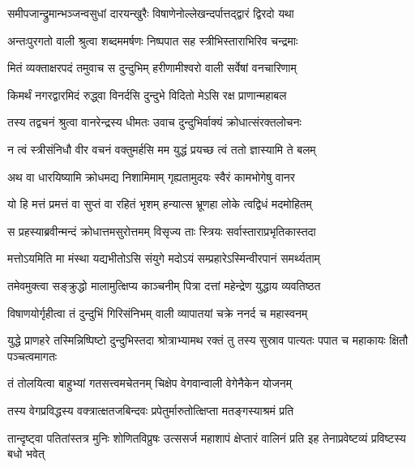 \twolineshloka
{समीपजान्द्रुमान्भञ्जन्वसुधां दारयन्खुरैः}
{विषाणेनोल्लेखन्दर्पात्तद्द्वारं द्विरदो यथा} %

\twolineshloka
{अन्तःपुरगतो वाली श्रुत्वा शब्दममर्षणः}
{निष्पपात सह स्त्रीभिस्ताराभिरिव चन्द्रमाः} %

\twolineshloka
{मितं व्यक्ताक्षरपदं तमुवाच स दुन्दुभिम्}
{हरीणामीश्वरो वाली सर्वेषां वनचारिणाम्} %

\twolineshloka
{किमर्थं नगरद्वारमिदं रुद्ध्वा विनर्दसि}
{दुन्दुभे विदितो मेऽसि रक्ष प्राणान्महाबल} %

\twolineshloka
{तस्य तद्वचनं श्रुत्वा वानरेन्द्रस्य धीमतः}
{उवाच दुन्दुभिर्वाक्यं क्रोधात्संरक्तलोचनः} %

\twolineshloka
{न त्वं स्त्रीसंनिधौ वीर वचनं वक्तुमर्हसि}
{मम युद्धं प्रयच्छ त्वं ततो ज्ञास्यामि ते बलम्} %

\twolineshloka
{अथ वा धारयिष्यामि क्रोधमद्य निशामिमाम्}
{गृह्यतामुदयः स्वैरं कामभोगेषु वानर} %

\twolineshloka
{यो हि मत्तं प्रमत्तं वा सुप्तं वा रहितं भृशम्}
{हन्यात्स भ्रूणहा लोके त्वद्विधं मदमोहितम्} %

\twolineshloka
{स प्रहस्याब्रवीन्मन्दं क्रोधात्तमसुरोत्तमम्}
{विसृज्य ताः स्त्रियः सर्वास्ताराप्रभृतिकास्तदा} %

\twolineshloka
{मत्तोऽयमिति मा मंस्था यद्यभीतोऽसि संयुगे}
{मदोऽयं सम्प्रहारेऽस्मिन्वीरपानं समर्थ्यताम्} %

\twolineshloka
{तमेवमुक्त्वा सङ्क्रुद्धो मालामुत्क्षिप्य काञ्चनीम्}
{पित्रा दत्तां महेन्द्रेण युद्धाय व्यवतिष्ठत} %

\twolineshloka
{विषाणयोर्गृहीत्वा तं दुन्दुभिं गिरिसंनिभम्}
{वाली व्यापातयां चक्रे ननर्द च महास्वनम्} %

\threelineshloka
{युद्धे प्राणहरे तस्मिन्निष्पिष्टो दुन्दुभिस्तदा}
{श्रोत्राभ्यामथ रक्तं तु तस्य सुस्राव पात्यतः}
{पपात च महाकायः क्षितौ पञ्चत्वमागतः} %

\twolineshloka
{तं तोलयित्वा बाहुभ्यां गतसत्त्वमचेतनम्}
{चिक्षेप वेगवान्वाली वेगेनैकेन योजनम्} %

\twolineshloka
{तस्य वेगप्रविद्धस्य वक्त्रात्क्षतजबिन्दवः}
{प्रपेतुर्मारुतोत्क्षिप्ता मतङ्गस्याश्रमं प्रति} %

\threelineshloka
{तान्दृष्ट्वा पतितांस्तत्र मुनिः शोणितविप्रुषः}
{उत्ससर्ज महाशापं क्षेप्तारं वालिनं प्रति}
{इह तेनाप्रवेष्टव्यं प्रविष्टस्य बधो भवेत्} %

